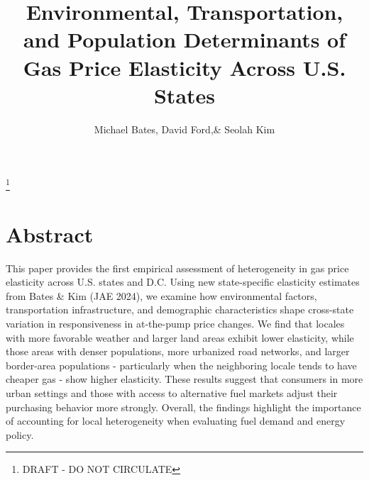 \documentclass[12pt,a4paper]{article}
\begin{document}
\title{Environmental, Transportation, and Population Determinants of Gas Price Elasticity Across U.S. States}
\author{Michael Bates, David Ford,\& Seolah Kim}
\maketitle
\footnote{DRAFT - DO NOT CIRCULATE} \\

\section{Abstract}
This paper provides the first empirical assessment of heterogeneity in gas price elasticity across U.S. states and D.C. Using new state-specific elasticity estimates from Bates \& Kim (JAE 2024), we examine how environmental factors, transportation infrastructure, and demographic characteristics shape cross-state variation in responsiveness in at-the-pump price changes. We find that locales with more favorable weather and larger land areas exhibit lower elasticity, while those areas with denser populations, more urbanized road networks, and larger border-area populations - particularly when the neighboring locale tends to have cheaper gas - show higher elasticity. These results suggest that consumers in more urban settings and those with access to alternative fuel markets adjust their purchasing behavior more strongly. Overall, the findings highlight the importance of accounting for local heterogeneity when evaluating fuel demand and energy policy. 


\graphicspath{{C:/Users/david/coding/03_GAS_TAX_HETEROGENEITY_paper/6000_LaTeX/}}
\end{document}
